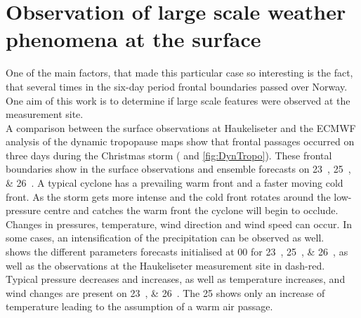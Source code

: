 \section{Observation of large scale weather phenomena at the surface}\label{sec:res:large_scale_sfc}
One of the main factors, that made this particular case so interesting is the fact, that several times in the six-day period frontal boundaries passed over Norway. One aim of this work is to determine if large scale features were observed at the measurement site. 
\\
A comparison between the surface observations at Haukeliseter and the ECMWF analysis of the dynamic tropopause maps show that frontal passages occurred on three days during the Christmas storm ( and \ref{fig:DynTropo}).  These frontal boundaries show in the surface observations and ensemble forecasts on \SIlist{23;25;26}{\dec}. A typical cyclone has a prevailing warm front and a faster moving cold front. As the storm gets more intense and the cold front rotates around the low-pressure centre and catches the warm front the cyclone will begin to occlude. Changes in pressures, temperature, wind direction and wind speed can occur. In some cases, an intensification of the precipitation can be observed as well.
\\
 shows the different parameters forecasts initialised at \SI{00}{\UTC} for \SIlist{23;25;26}{\dec}, as well as the observations at the Haukeliseter measurement site in dash-red.
Typical pressure decreases and increases, as well as temperature increases, and wind changes are present on \SIlist{23;26}{\dec}. The \SI{25}{\dec} shows only an increase of temperature leading to the assumption of a warm air passage.
